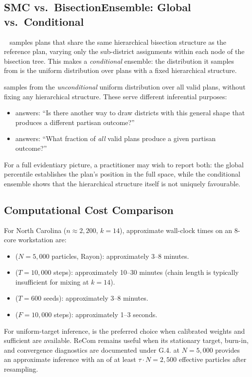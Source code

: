 \subsection{SMC vs.\ BisectionEnsemble: Global vs.\ Conditional}

\be{}~\citep{h1paper} samples plans that share the same hierarchical
bisection structure as the reference plan, varying only the sub-district
assignments within each node of the bisection tree.
This makes \be{} a \emph{conditional} ensemble: the distribution it samples
from is the uniform distribution over plans with a fixed hierarchical structure.

\smc{} samples from the \emph{unconditional} uniform distribution over all
valid plans, without fixing any hierarchical structure.
These serve different inferential purposes:
\begin{itemize}
  \item \be{} answers: ``Is there another way to draw districts with this
        general shape that produces a different partisan outcome?''
  \item \smc{} answers: ``What fraction of \emph{all} valid plans produce
        a given partisan outcome?''
\end{itemize}

For a full evidentiary picture, a practitioner may wish to report both: the
\smc{} global percentile establishes the plan's position in the full space,
while the \be{} conditional ensemble shows that the hierarchical structure
itself is not uniquely favourable.

\subsection{Computational Cost Comparison}

For North Carolina ($n \approx 2{,}200$, $k = 14$), approximate wall-clock
times on an 8-core workstation are:
\begin{itemize}
  \item \smc{} ($N = 5{,}000$ particles, Rayon): approximately 3--8 minutes.
  \item \recom{} ($T = 10{,}000$ steps): approximately 10--30 minutes
        (chain length is typically insufficient for mixing at $k = 14$).
  \item \cs{} ($T = 600$ seeds): approximately 3--8 minutes.
  \item \flip{} ($F = 10{,}000$ steps): approximately 1--3 seconds.
\end{itemize}

For uniform-target inference, \smc{} is the preferred choice when calibrated
weights and sufficient \ess{} are available. ReCom remains useful when its
stationary target, burn-in, and convergence diagnostics are documented under
G.4. \smc{} at $N = 5{,}000$ provides an approximate inference with
an \ess{} of at least $\tau \cdot N = 2{,}500$ effective particles after
resampling.
